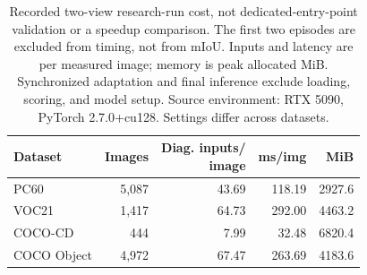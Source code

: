 \begin{table}[t]
\caption{Recorded two-view research-run cost, not dedicated-entry-point validation or a speedup comparison. The first two episodes are excluded from timing, not from mIoU. Inputs and latency are per measured image; memory is peak allocated MiB. Synchronized adaptation and final inference exclude loading, scoring, and model setup. Source environment: RTX 5090, PyTorch 2.7.0+cu128. Settings differ across datasets.}
\label{tab:cost}
\centering\small
\begin{tabular}{@{}lrrrr@{}}
\toprule
Dataset & Images & \shortstack{Diag. inputs/\\image} & ms/img & MiB \\
\midrule
PC60 & 5,087 & 43.69 & 118.19 & 2927.6 \\
VOC21 & 1,417 & 64.73 & 292.00 & 4463.2 \\
COCO-CD & 444 & 7.99 & 32.48 & 6820.4 \\
COCO Object & 4,972 & 67.47 & 263.69 & 4183.6 \\
\bottomrule
\end{tabular}
\end{table}
